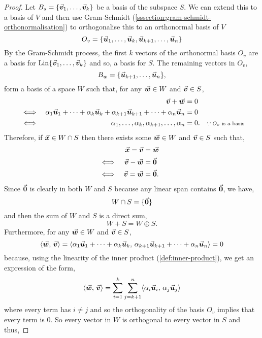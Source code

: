 \documentclass[../MathsNotesBase.tex]{subfiles}
\begin{document}
{		\bigskip
		\begin{proof}
			Let ${ B_s = \{ \vec{\bm{v}}_1,\dots,\vec{\bm{v}}_k \} }$ be a basis of the subspace $S$. We can extend this to a basis of $V$ and then use Gram-Schmidt (\ref{sssection:gram-schmidt-orthonormalisation}) to orthogonalise this to an orthonormal basis of $V$
			\[ O_v = \{ \vec{\bm{u}}_1,\dots,\vec{\bm{u}}_k,\vec{\bm{u}}_{k+1},\dots,\vec{\bm{u}}_{n} \} \]
			By the Gram-Schmidt process, the first $k$ vectors of the orthonormal basis $O_v$ are a basis for ${ \operatorname{Lin} \{ \vec{\bm{v}}_1,\dots,\vec{\bm{v}}_k \} }$ and so, a basis for $S$. The remaining vectors in $O_v$,
			\[ B_w = \{ \vec{\bm{u}}_{k+1},\dots,\vec{\bm{u}}_{n} \}, \]
			form a basis of a space $W$ such that, for any ${ \vec{\bm{w}} \in W }$ and ${ \vec{\bm{v}} \in S }$,
			\[\begin{aligned}
				&& \vec{\bm{v}} + \vec{\bm{w}} &= 0 \\
				&\iff & \alpha_1 \vec{\bm{u}}_1 + \cdots + \alpha_k \vec{\bm{u}}_k + \alpha_{k+1} \vec{\bm{u}}_{k+1} + \cdots + \alpha_n \vec{\bm{u}}_n &= 0 &\text{\scriptsize{}} \\
				&\iff & \alpha_1, \dots, \alpha_k, \alpha_{k+1}, \dots, \alpha_n &= 0. &\text{\scriptsize{$\because O_v$ is a basis}}
			\end{aligned}\]
			Therefore, if ${ \vec{\bm{x}} \in W \cap S }$ then there exists some ${ \vec{\bm{w}} \in W }$ and ${ \vec{\bm{v}} \in S }$ such that,
			\[\begin{aligned}
				&& \vec{\bm{x}} = \vec{\bm{v}} &= \vec{\bm{w}} \\
				&\iff & \vec{\bm{v}} - \vec{\bm{w}} &= \vec{\bm{0}} &\text{\scriptsize{}} \\
				&\iff & \vec{\bm{v}} = \vec{\bm{w}} &= \vec{\bm{0}}.
			\end{aligned}\]
			Since $\vec{\bm{0}}$ is clearly in both $W$ and $S$ because any linear span contains $\vec{\bm{0}}$, we have,
			\[  W \cap S = \{\vec{\bm{0}}\} \]
			and then the sum of $W$ and $S$ is a direct sum,
			\[ W + S = W \oplus S. \]
			Furthermore, for any ${ \vec{\bm{w}} \in W }$ and ${ \vec{\bm{v}} \in S }$,
			\[ \langle \vec{\bm{w}},\, \vec{\bm{v}} \rangle = \langle \alpha_1 \vec{\bm{u}}_1 + \cdots + \alpha_k \vec{\bm{u}}_k,\, \alpha_{k+1} \vec{\bm{u}}_{k+1} + \cdots + \alpha_n \vec{\bm{u}}_n \rangle = 0 \]
			because, using the linearity of the inner product (\autoref{def:inner-product}), we get an expression of the form,
			\[ \langle \vec{\bm{w}},\, \vec{\bm{v}} \rangle = \sum_{i = 1}^k \sum_{j = k+1}^n \langle \alpha_i \vec{\bm{u}}_i,\, \alpha_j \vec{\bm{u}}_j \rangle \]
			where every term has ${ i \neq j }$ and so the orthogonality of the basis $O_v$ implies that every term is 0. So every vector in $W$ is orthogonal to every vector in $S$ and thus,

\end{proof}}
\end{document}

